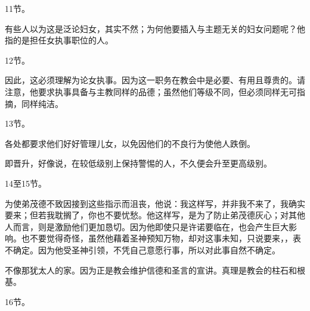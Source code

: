 11节。 \par

有些人以为这是泛论妇女，其实不然；为何他要插入与主题无关的妇女问题呢？他指的是担任女执事职位的人。\par

12节。 \par

因此，这必须理解为论女执事。因为这一职务在教会中是必要、有用且尊贵的。请注意，他要求执事具备与主教同样的品德；虽然他们等级不同，但必须同样无可指摘，同样纯洁。\par

\par

13节。 \par

各处都要求他们好好管理儿女，以免因他们的不良行为使他人跌倒。\par

即晋升，好像说，在较低级别上保持警惕的人，不久便会升至更高级别。\par

14至15节。 \par

为使弟茂德不致因接到这些指示而沮丧，他说：我这样写，并非我不来了，我确实要来；但若我耽搁了，你也不要忧愁。他这样写，是为了防止弟茂德灰心；对其他人而言，则是激励他们更加恳切。因为他即使只是许诺要临在，也会产生巨大影响。也不要觉得奇怪，虽然他藉着圣神预知万物，却对这事未知，只说要来，，表不确定。因为他受圣神引领，不凭自己意愿行事，所以对此事自然不确定。\par

不像那犹太人的家。因为正是教会维护信德和圣言的宣讲。真理是教会的柱石和根基。\par

16节。 \par

